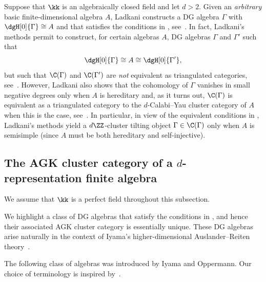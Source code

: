 \documentclass[a4paper]{amsart}
\begin{document}
\begin{remark}
  \label{rmk:Ladkani}
  Suppose that $\kk$ is an algebraically closed field and let $d>2$. Given an
  \emph{arbitrary} basic finite-dimensional algebra $A$, Ladkani constructs a DG
  algebra $\Gamma$ with $\dgH[0]{\Gamma}\cong A$ and that satisfies the
  conditions in , see~\cite[Thm.~3.26]{Lad16}. In fact,
  Ladkani's methods permit to construct, for certain algebras $A$, DG algebras
  $\Gamma$ and $\Gamma'$ such that
  \[
    \dgH[0]{\Gamma}\cong A\cong\dgH[0]{\Gamma'},
  \]
  but such that $\C(\Gamma)$ and $\C(\Gamma')$ are \emph{not} equivalent as
  triangulated categories, see~\cite[Ex.~3.30 and Prop.~3.31]{Lad16}. However,
  Ladkani also shows that the cohomology of $\Gamma$ vanishes in small negative
  degrees only when $A$ is hereditary and, as it turns out, $\C(\Gamma)$ is
  equivalent as a triangulated category to the $d$-Calabi--Yau cluster category
  of $A$ \cite[Sec.~6]{Kel05} when this is the case,
  see~\cite[Prop.~3.18 and Ex.~3.30]{Lad16}. In particular, in view of the equivalent
  conditions in , Ladkani's methods yield a $d\ZZ$-cluster
  tilting object $\Gamma\in\C(\Gamma)$ only when $A$ is semisimple (since $A$
  must be both hereditary and self-injective).
\end{remark}

\subsection{The AGK cluster category of a $d$-representation finite algebra}

\begin{setting}
  We assume that $\kk$ is a perfect field throughout this subsection.
\end{setting}

We highlight a class of DG algebras that satisfy the conditions in
, and hence their associated AGK cluster category is
essentially unique. These DG algebras arise naturally in the context of Iyama's
higher-dimensional Auslander--Reiten theory~\cite{Iya07a,Iya07}.

The following class of algebras was introduced by Iyama and Oppermann. Our
choice of terminology is inspired by~\cite[Def.~3.2 and Thm.~3.4]{HIO14}.
\end{document}
